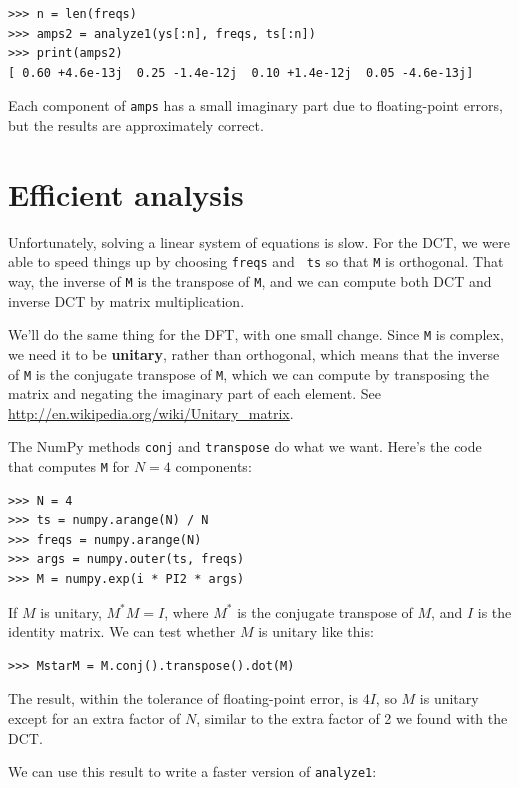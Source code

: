 \documentclass[12pt]{book}
\begin{document}
\begin{verbatim}
>>> n = len(freqs)
>>> amps2 = analyze1(ys[:n], freqs, ts[:n])
>>> print(amps2)
[ 0.60 +4.6e-13j  0.25 -1.4e-12j  0.10 +1.4e-12j  0.05 -4.6e-13j]
\end{verbatim}

Each component of {\tt amps} has a small imaginary part due to
floating-point errors, but the results are approximately correct.


\section{Efficient analysis}

Unfortunately, solving a linear system of equations is slow.  For the
DCT, we were able to speed things up by choosing {\tt freqs} and {\tt
  ts} so that {\tt M} is orthogonal.  That way, the inverse of {\tt M}
is the transpose of {\tt M}, and we can compute both DCT and inverse
DCT by matrix multiplication.

We'll do the same thing for the DFT, with one small change.
Since {\tt M} is complex, we need it to be {\bf unitary}, rather
than orthogonal, which means that the inverse of {\tt M} is
the conjugate transpose of {\tt M}, which we can compute by
transposing the matrix and negating the imaginary part of each
element.  See \url{http://en.wikipedia.org/wiki/Unitary_matrix}. 

The NumPy methods {\tt conj} and {\tt transpose} do what we
want.  Here's the code that computes {\tt M} for $N=4$ components:

\begin{verbatim}
>>> N = 4
>>> ts = numpy.arange(N) / N
>>> freqs = numpy.arange(N)
>>> args = numpy.outer(ts, freqs)
>>> M = numpy.exp(i * PI2 * args)
\end{verbatim}

If $M$ is unitary, $M^*M = I$, where $M^*$ is the conjugate transpose
of $M$, and $I$ is the identity matrix.  We can test whether $M$
is unitary like this:

\begin{verbatim}
>>> MstarM = M.conj().transpose().dot(M)
\end{verbatim}

The result, within the tolerance of floating-point error, is
$4 I$, so $M$ is unitary except for an extra factor of $N$,
similar to the extra factor of 2 we found with the DCT.

We can use this result to write a faster version of {\tt analyze1}:
\end{document}
